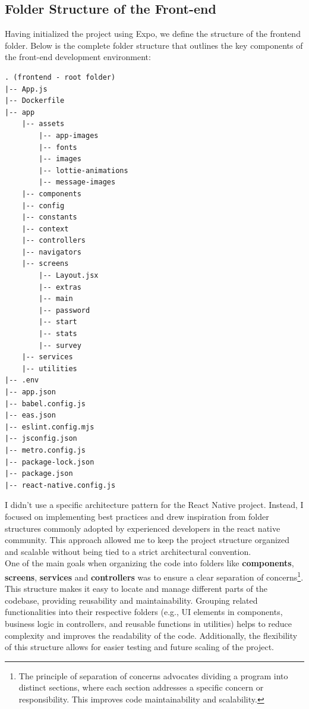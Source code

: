 \subsection{Folder Structure of the Front-end}

Having initialized the project using Expo, we define the structure of the frontend folder. Below is the complete folder structure that outlines the key components of the front-end development environment:

\vspace{5mm}

\begin{lstlisting}[caption=frontend Folder Structure]
. (frontend - root folder)
|-- App.js
|-- Dockerfile
|-- app
    |-- assets
        |-- app-images
        |-- fonts
        |-- images
        |-- lottie-animations
        |-- message-images
    |-- components
    |-- config
    |-- constants
    |-- context
    |-- controllers
    |-- navigators
    |-- screens
        |-- Layout.jsx
        |-- extras
        |-- main
        |-- password
        |-- start
        |-- stats
        |-- survey
    |-- services
    |-- utilities
|-- .env
|-- app.json
|-- babel.config.js
|-- eas.json
|-- eslint.config.mjs
|-- jsconfig.json
|-- metro.config.js
|-- package-lock.json
|-- package.json
|-- react-native.config.js
\end{lstlisting}

\vspace{5mm}

\noindent I didn't use a specific architecture pattern for the React Native project. Instead, I focused on implementing best practices and drew inspiration from folder structures commonly adopted by experienced developers in the react native community. This approach allowed me to keep the project structure organized and scalable without being tied to a strict architectural convention.\vspace{5mm} \\
One of the main goals when organizing the code into folders like \textbf{components}, \textbf{screens}, \textbf{services} and \textbf{controllers} was to ensure a clear separation of concerns\footnote{The principle of separation of concerns advocates dividing a program into distinct sections, where each section addresses a specific concern or responsibility. This improves code maintainability and scalability.}. This structure makes it easy to locate and manage different parts of the codebase, providing reusability and maintainability. Grouping related functionalities into their respective folders (e.g., UI elements in components, business logic in controllers, and reusable functions in utilities) helps to reduce complexity and improves the readability of the code. Additionally, the flexibility of this structure allows for easier testing and future scaling of the project.

